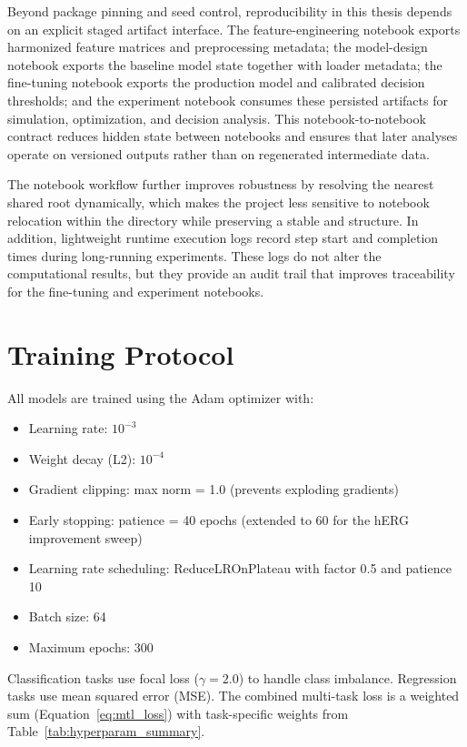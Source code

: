 \documentclass[a4paper,11pt,twoside]{report}
\begin{document}
\noindent Beyond package pinning and seed control, reproducibility in this thesis depends on an explicit staged artifact interface. The feature-engineering notebook exports harmonized feature matrices and preprocessing metadata; the model-design notebook exports the baseline model state together with loader metadata; the fine-tuning notebook exports the production model and calibrated decision thresholds; and the experiment notebook consumes these persisted artifacts for simulation, optimization, and decision analysis. This notebook-to-notebook contract reduces hidden state between notebooks and ensures that later analyses operate on versioned outputs rather than on regenerated intermediate data.

\noindent The notebook workflow further improves robustness by resolving the nearest shared  root dynamically, which makes the project less sensitive to notebook relocation within the  directory while preserving a stable  and  structure. In addition, lightweight runtime execution logs record step start and completion times during long-running experiments. These logs do not alter the computational results, but they provide an audit trail that improves traceability for the fine-tuning and experiment notebooks.

\section{Training Protocol}

All models are trained using the Adam optimizer with:
\begin{itemize}
  \item Learning rate: $10^{-3}$
  \item Weight decay (L2): $10^{-4}$
  \item Gradient clipping: max norm = 1.0 (prevents exploding gradients)
  \item Early stopping: patience = 40 epochs (extended to 60 for the hERG improvement sweep)
  \item Learning rate scheduling: ReduceLROnPlateau with factor 0.5 and patience 10
  \item Batch size: 64
  \item Maximum epochs: 300
\end{itemize}

\noindent Classification tasks use focal loss ($\gamma=2.0$) to handle class imbalance. Regression tasks use mean squared error (MSE). The combined multi-task loss is a weighted sum (Equation~\ref{eq:mtl_loss}) with task-specific weights from Table~\ref{tab:hyperparam_summary}.
\end{document}
